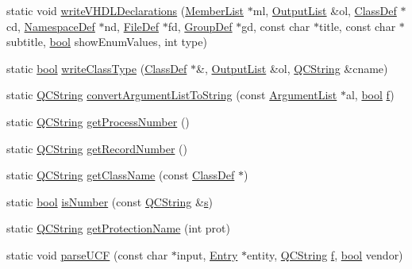 \begin{DoxyCompactItemize}
\item 
static void \hyperlink{class_vhdl_doc_gen_a30ec463210e92bb4f1cdd02bf1893c86}{write\+V\+H\+D\+L\+Declarations} (\hyperlink{class_member_list}{Member\+List} $\ast$ml, \hyperlink{class_output_list}{Output\+List} \&ol, \hyperlink{class_class_def}{Class\+Def} $\ast$cd, \hyperlink{class_namespace_def}{Namespace\+Def} $\ast$nd, \hyperlink{class_file_def}{File\+Def} $\ast$fd, \hyperlink{class_group_def}{Group\+Def} $\ast$gd, const char $\ast$title, const char $\ast$subtitle, \hyperlink{qglobal_8h_a1062901a7428fdd9c7f180f5e01ea056}{bool} show\+Enum\+Values, int type)
\item 
static \hyperlink{qglobal_8h_a1062901a7428fdd9c7f180f5e01ea056}{bool} \hyperlink{class_vhdl_doc_gen_a201149bb595839029a622100737e0dea}{write\+Class\+Type} (\hyperlink{class_class_def}{Class\+Def} $\ast$\&, \hyperlink{class_output_list}{Output\+List} \&ol, \hyperlink{class_q_c_string}{Q\+C\+String} \&cname)
\item 
static \hyperlink{class_q_c_string}{Q\+C\+String} \hyperlink{class_vhdl_doc_gen_aa77f9467a8af575f85643ececc8cf4e3}{convert\+Argument\+List\+To\+String} (const \hyperlink{class_argument_list}{Argument\+List} $\ast$al, \hyperlink{qglobal_8h_a1062901a7428fdd9c7f180f5e01ea056}{bool} \hyperlink{060__command__switch_8tcl_af6830d2c644b45088ea8f1f74a46b778}{f})
\item 
static \hyperlink{class_q_c_string}{Q\+C\+String} \hyperlink{class_vhdl_doc_gen_a6524e8718f3f956610df4dfc71be204c}{get\+Process\+Number} ()
\item 
static \hyperlink{class_q_c_string}{Q\+C\+String} \hyperlink{class_vhdl_doc_gen_a2e65f831a03ff54d13240da96843cd60}{get\+Record\+Number} ()
\item 
static \hyperlink{class_q_c_string}{Q\+C\+String} \hyperlink{class_vhdl_doc_gen_a2c4458b0e27e9b97db254d082d1487d2}{get\+Class\+Name} (const \hyperlink{class_class_def}{Class\+Def} $\ast$)
\item 
static \hyperlink{qglobal_8h_a1062901a7428fdd9c7f180f5e01ea056}{bool} \hyperlink{class_vhdl_doc_gen_a37b3bf29e7ec4cfe5c453f5a5d4e8f71}{is\+Number} (const \hyperlink{class_q_c_string}{Q\+C\+String} \&\hyperlink{060__command__switch_8tcl_a011c73f2dbb87635a3b4206c72355f6e}{s})
\item 
static \hyperlink{class_q_c_string}{Q\+C\+String} \hyperlink{class_vhdl_doc_gen_a4325f5840fe29089b4d3ea4b8c8b0fef}{get\+Protection\+Name} (int prot)
\item 
static void \hyperlink{class_vhdl_doc_gen_aa2a0267e84b178cc29681eeaea8cfe35}{parse\+U\+C\+F} (const char $\ast$input, \hyperlink{class_entry}{Entry} $\ast$entity, \hyperlink{class_q_c_string}{Q\+C\+String} \hyperlink{060__command__switch_8tcl_af6830d2c644b45088ea8f1f74a46b778}{f}, \hyperlink{qglobal_8h_a1062901a7428fdd9c7f180f5e01ea056}{bool} vendor)

\end{DoxyCompactItemize}
